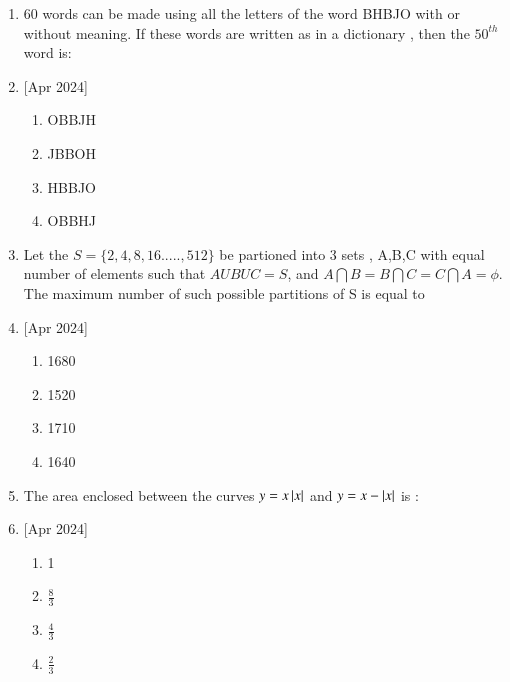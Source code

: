 \documentclass[journal]{IEEEtran}
\begin{document}
\begin{enumerate}
\setcounter{enumi}{0}
 
    \item 60 words can be made using all the letters of the word BHBJO with or without meaning. If these words are written as in a dictionary , then the $50^{th}$ word is:
    \item{[Apr 2024]}
        \begin{multicols}{4}
            \begin{enumerate}
                \item OBBJH
                \item JBBOH
                \item HBBJO
                \item OBBHJ
            \end{enumerate}
        \end{multicols}

    \item Let the $S=\{2,4,8,16.....,512\}$ be partioned into 3 sets , A,B,C with equal number of elements such that $AUBUC=S$, and $A \bigcap B=B \bigcap C=C \bigcap A=\phi$. The maximum number of such possible partitions of S is equal to
     \item{[Apr 2024]}


		\begin{multicols}{4}
			\begin{enumerate}
				\item 1680
				\item  1520
				\item 1710
				\item  1640
			\end{enumerate}
		\end{multicols}

    \item The area enclosed between the curves $y=x\left\vert x\right\vert$ and $y=x-\left\vert x\right\vert$ is  :
     \item{[Apr 2024]}
        \begin{multicols}{4}
            \begin{enumerate}
              \item 1
              \item $\frac{8}{3}$
              \item $\frac{4}{3}$
              \item $\frac{2}{3}$
            \end{enumerate}
        \end{multicols}


\end{enumerate}
\end{document}
